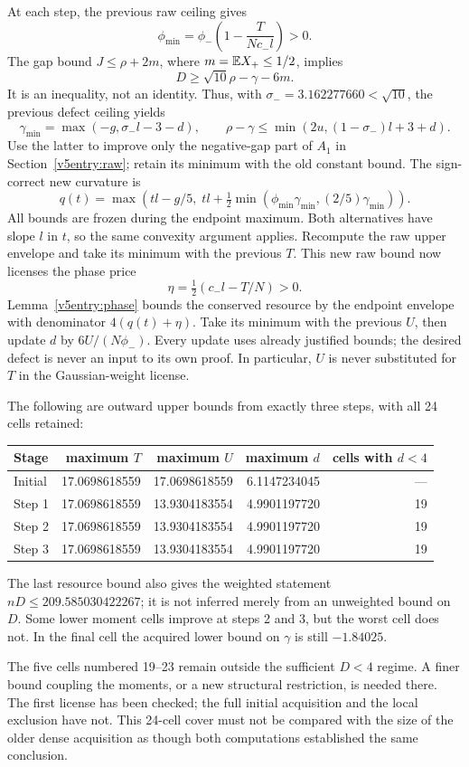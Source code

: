 At each step, the previous raw ceiling gives
\[
 \phi_{\min}=\phi_-\left(1-\frac{T}{Nc_-l}\right)>0.
\]
The gap bound $J\le\rho+2m$, where $m=\mathbb E X_+\le1/2$, implies
\[
 D\ge\sqrt{10}\rho-\gamma-6m.
\]
It is an inequality, not an identity. Thus, with
$\sigma_-=3.162277660<\sqrt{10}$, the previous defect ceiling yields
\[
 \gamma_{\min}=\max(-g,\sigma_-l-3-d),\qquad
 \rho-\gamma\le\min(2u,(1-\sigma_-)l+3+d).
\]
Use the latter to improve only the negative-gap part of $A_1$ in
Section~\ref{v5entry:raw}; retain its minimum with the old constant bound.
The sign-correct new curvature is
\[
 q(t)=\max\left(tl-g/5,\;
 tl+\tfrac12\min(\phi_{\min}\gamma_{\min},(2/5)\gamma_{\min})\right).
\]
All bounds are frozen during the endpoint maximum. Both alternatives
have slope $l$ in $t$, so the same convexity argument applies.
Recompute the raw upper envelope and take its minimum with the previous
$T$. This new raw bound now licenses the phase price
\[
 \eta=\tfrac12(c_-l-T/N)>0.
\]
Lemma~\ref{v5entry:phase} bounds the conserved resource by the endpoint
envelope with denominator $4(q(t)+\eta)$. Take its minimum with the
previous $U$, then update $d$ by $6U/(N\phi_-)$.
Every update uses already justified bounds; the desired defect is never
an input to its own proof. In particular, $U$ is never substituted for
$T$ in the Gaussian-weight license.

The following are outward upper bounds from exactly three steps, with
all 24 cells retained:
\begin{center}
\begin{tabular}{@{}lrrrr@{}}
\toprule
Stage & maximum $T$ & maximum $U$ & maximum $d$ & cells with $d<4$\\
\midrule
Initial &17.0698618559&17.0698618559&6.1147234045&---\\
Step 1 &17.0698618559&13.9304183554&4.9901197720&19\\
Step 2 &17.0698618559&13.9304183554&4.9901197720&19\\
Step 3 &17.0698618559&13.9304183554&4.9901197720&19\\
\bottomrule
\end{tabular}
\end{center}
The last resource bound also gives the weighted statement
$nD\le209.585030422267$; it is not inferred merely from an unweighted
bound on $D$. Some lower moment cells improve at steps 2 and 3, but the
worst cell does not. In the final cell the acquired lower bound on
$\gamma$ is still $-1.84025$.

The five cells numbered 19--23 remain outside the sufficient $D<4$
regime. A finer bound coupling the moments, or a new structural
restriction, is needed there. The first license has been checked; the
full initial acquisition and the local exclusion have not. This 24-cell
cover must not be compared with the size of the older dense acquisition
as though both computations established the same conclusion.
